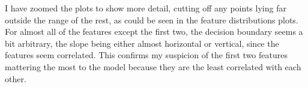 I have zoomed the plots to show more detail, cutting off any points lying far outside the range of the rest, as could be seen in the feature distributions plots.
For almost all of the features except the first two, the decision boundary seems a bit arbitrary, the slope being either almost horizontal or vertical, since the features seem correlated. 
This confirms my suspicion of the first two features mattering the most to the model because they are the least correlated with each other.



















